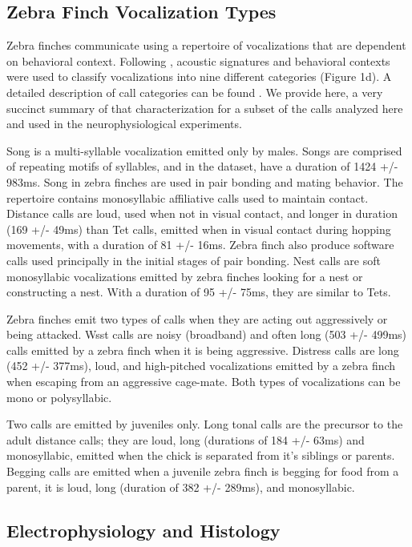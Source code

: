 \subsection{Zebra Finch Vocalization Types}

Zebra finches communicate using a repertoire of vocalizations that are dependent on behavioral context. Following \cite{Zann1996}, acoustic signatures and behavioral contexts were used to classify vocalizations into nine different categories (Figure 1d). A detailed description of call categories can be found \cite{Elie2015a}. We provide here, a very succinct summary of that characterization for a subset of the calls analyzed here and used in the neurophysiological experiments.

Song is a multi-syllable vocalization emitted only by males. Songs are comprised of repeating motifs of syllables, and in the dataset, have a duration of 1424 +/- 983ms. Song in zebra finches are used in pair bonding and mating behavior. The repertoire contains monosyllabic affiliative calls used to maintain contact. Distance calls are loud, used when not in visual contact, and longer in duration (169 +/- 49ms) than Tet calls, emitted when in visual contact during hopping movements, with a duration of 81 +/- 16ms. Zebra finch also produce software calls used principally in the initial stages of pair bonding. Nest calls are soft monosyllabic vocalizations emitted by zebra finches looking for a nest or constructing a nest. With a duration of 95 +/- 75ms, they are similar to Tets.

Zebra finches emit two types of calls when they are acting out aggressively or being attacked. Wsst calls are noisy (broadband) and often long (503 +/- 499ms) calls emitted by a zebra finch when it is being aggressive. Distress calls are long (452 +/- 377ms), loud, and high-pitched vocalizations emitted by a zebra finch when escaping from an aggressive cage-mate. Both types of vocalizations can be mono or polysyllabic.

Two calls are emitted by juveniles only. Long tonal calls are the precursor to the adult distance calls; they are loud, long (durations of 184 +/- 63ms) and monosyllabic, emitted when the chick is separated from it’s siblings or parents. Begging calls are emitted when a juvenile zebra finch is begging for food from a parent, it is loud, long (duration of 382 +/- 289ms), and monosyllabic.


\subsection{Electrophysiology and Histology}

